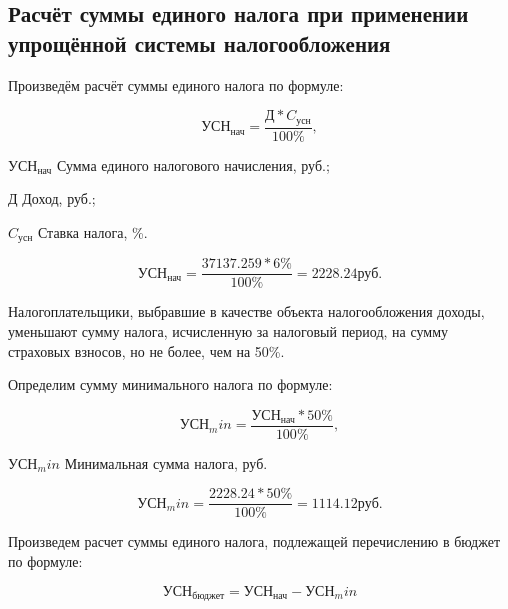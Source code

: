 \subsection{Расчёт суммы единого налога при применении упрощённой системы налогообложения}

Произведём расчёт суммы единого налога по формуле:

\begin{equation}
    \text{УСН}_\text{нач} = \frac{\text{Д} * C_\text{усн}}{100\%},
\end{equation}

\begin{eqexpl}[25mm]
    \item{$\text{УСН}_\text{нач}$} Сумма единого налогового начисления, руб.;
    \item{Д} Доход, руб.;
    \item{$C_\text{усн}$} Ставка налога, \%.
\end{eqexpl}

\begin{equation*}
    \text{УСН}_\text{нач} = \frac{37137.259 * 6\%}{100\%} = 2228.24 \text{руб}.
\end{equation*}

Налогоплательщики, выбравшие в качестве объекта налогообложения
доходы, уменьшают сумму налога, исчисленную за налоговый период, на
сумму страховых взносов, но не более, чем на 50\%.

Определим сумму минимального налога по формуле:

\begin{equation}
    \text{УСН}_min = \frac{\text{УСН}_\text{нач} * 50\%}{100\%},
\end{equation}

\begin{eqexpl}[25mm]
    \item{$\text{УСН}_min$} Минимальная сумма налога, руб.
\end{eqexpl}

\begin{equation*}
    \text{УСН}_min = \frac{2228.24 * 50\%}{100\%} = 1114.12 руб.
\end{equation*}

Произведем расчет суммы единого налога, подлежащей перечислению
в бюджет по формуле:

\begin{equation}
    \text{УСН}_\text{бюджет} = \text{УСН}_\text{нач} - \text{УСН}_min
\end{equation}

